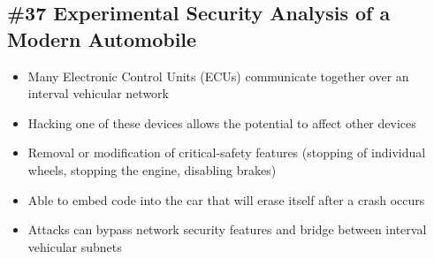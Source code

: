 \subsection{\#37 Experimental Security Analysis of a Modern Automobile}
\begin{itemize}
	\item Many Electronic Control Units (ECUs) communicate together over an interval vehicular network
	\item Hacking one of these devices allows the potential to affect other devices
	\item Removal or modification of critical-safety features (stopping of individual wheels, stopping the engine, disabling brakes)
	\item Able to embed code into the car that will erase itself after a crash occurs
	\item Attacks can bypass network security features and bridge between interval vehicular subnets
\end{itemize}